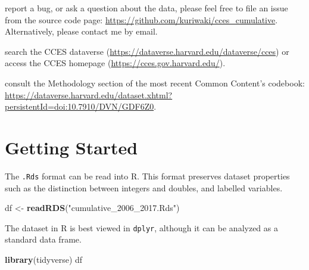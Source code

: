 \documentclass[10pt,article,oneside]{memoir}
\theoremstyle{definition}
\newenvironment{Shaded}{\begin{snugshade}}{\end{snugshade}}
\newcommand{\KeywordTok}[1]{\textcolor[rgb]{0.13,0.29,0.53}{\textbf{#1}}}
\newcommand{\StringTok}[1]{\textcolor[rgb]{0.31,0.60,0.02}{#1}}
\newcommand{\NormalTok}[1]{#1}
\begin{document}
\begin{tcolorbox}[boxrule=0pt,  fonttitle=\bfseries, subtitle style={boxrule=0.4pt, colback=black!75!white}]

report a bug, or ask a question about the data, please feel free to file an issue from the source code page:  \url{https://github.com/kuriwaki/cces_cumulative}. Alternatively, please contact me by email.

search the CCES dataverse (\url{https://dataverse.harvard.edu/dataverse/cces}) or access the CCES homepage (\url{https://cces.gov.harvard.edu/}).

consult the Methodology section of the most recent Common Content's codebook: \url{https://dataverse.harvard.edu/dataset.xhtml?persistentId=doi:10.7910/DVN/GDF6Z0}.

\end{tcolorbox}

\bigskip

\newpage

\section{Getting Started}\label{getting-started}

The \texttt{.Rds} format can be read into R. This format preserves
dataset properties such as the distinction between integers and doubles,
and labelled variables.

\begin{Shaded}
\begin{Highlighting}[]
\NormalTok{df <-}\StringTok{ }\KeywordTok{readRDS}\NormalTok{(}\StringTok{"cumulative_2006_2017.Rds"}\NormalTok{)}
\end{Highlighting}
\end{Shaded}

The dataset in R is best viewed in \texttt{dplyr}, although it can be
analyzed as a standard data frame.

\begin{Shaded}
\begin{Highlighting}[]
\KeywordTok{library}\NormalTok{(tidyverse)}
\NormalTok{df}
\end{Highlighting}
\end{Shaded}
\end{document}
